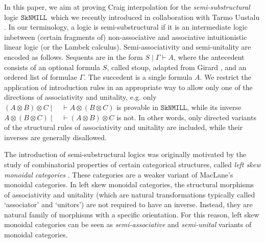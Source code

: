 \documentclass[sn-mathphys-num]{sn-jnl}%
\newcommand{\GG}{\Gamma}
\newcommand{\vd}{\vdash}
\newcommand{\ot}{\otimes}
\newcommand{\SkNMILL}{$\mathtt{SkNMILL}$}
\theoremstyle{thmstyleone}%
\theoremstyle{thmstyletwo}%
\theoremstyle{thmstylethree}%
\begin{document}
In this paper, we aim at proving Craig interpolation for the \emph{semi-substructural} logic \SkNMILL\ which we recently introduced in collaboration with Tarmo Uustalu \cite{UVW:protsn}.
In our terminology, a logic is semi-substructural if it is an intermediate logic inbetween (certain fragments of) non-associative and associative intuitionistic linear logic (or the Lambek calculus).
Semi-associativity and semi-unitality are encoded as follows.
Sequents are in the form $S \mid \GG \vdash A$, where the antecedent consists of an optional formula $S$, called stoup, adapted from Girard \cite{girard:constructive:91}, and an ordered list of formulae $\GG$.
The succedent is a single formula $A$.
We restrict the application of introduction rules in an appropriate way to allow only one of the directions of associativity and unitality, e.g. only $(A \ot B)\ot C \mid \quad \vd A \ot (B \ot C)$ is provable in \SkNMILL, while its inverse $A \ot (B \ot C) \mid \quad \vd (A \ot B) \ot C$ is not.
In other words, only directed variants of the structural rules of associativity and unitality are included, while their inverses are generally disallowed.

The introduction of semi-substructural logics was originally motivated by the study of combinatorial properties of certain categorical structures, called \emph{left skew monoidal categories} \cite{szlachanyi:skew-monoidal:2012}.
These categories are a weaker variant of MacLane's monoidal categories.
In left skew monoidal categories, the structural morphisms of associativity and unitality (which are natural transformations typically called `associator' and `unitors') are not required to have an inverse. Instead, they are natural family of morphisms with a specific orientation.
For this reason, left skew monoidal categories can be seen as \emph{semi-associative} and \emph{semi-unital} variants of monoidal categories. 
\end{document}
